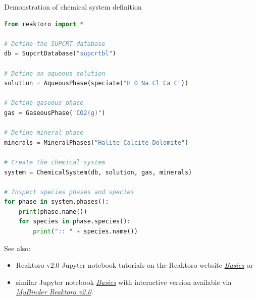 %
\begin{frame}{Demonstration of chemical system definition}
	
\begin{lstlisting}[language=Python, caption=Chemical system definition]
from reaktoro import *

# Define the SUPCRT database
db = SupcrtDatabase("supcrtbl")

# Define an aqueous solution
solution = AqueousPhase(speciate("H O Na Cl Ca C")) 

# Define gaseous phase
gas = GaseousPhase("CO2(g)")

# Define mineral phase
minerals = MineralPhases("Halite Calcite Dolomite")

# Create the chemical system
system = ChemicalSystem(db, solution, gas, minerals)

# Inspect species phases and species
for phase in system.phases():
    print(phase.name())
    for species in phase.species():
        print(":: " + species.name())
\end{lstlisting}
See also:
\begin{itemize}
    \item Reaktoro v2.0 Jupyter notebook tutorials on the Reaktoro website \href{https://reaktoro.org/tutorials/basics/index.html}{\textcolor{indigo(dye)}{\it Basics}} or
    \item similar Jupyter notebook  \href{https://github.com/mtsveta/reaktoro-v2-workshop/tree/main/tutorials/basics}{\textcolor{indigo(dye)}{\it Basics}} with interactive version available via \href{https://mybinder.org/v2/gh/mtsveta/reaktoro-v2-workshop/main?labpath=overview.ipynb}{\textcolor{indigo(dye)}{\it MyBinder Reaktoro v2.0}}.
\end{itemize}
%
\end{frame}


